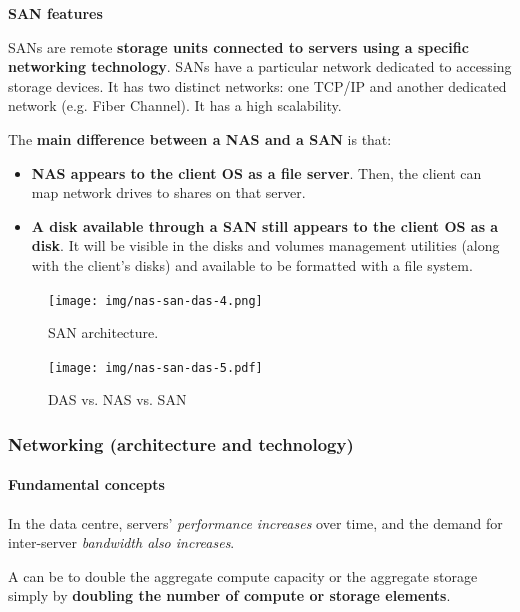 \highspace
\begin{flushleft}
	\textcolor{Red2}{ \textbf{SAN features}}
\end{flushleft}
SANs are remote \textbf{storage units connected to servers using a specific networking technology}. SANs have a particular network dedicated to accessing storage devices. It has two distinct networks: one TCP/IP and another dedicated network (e.g. Fiber Channel). It has a high scalability.

\highspace
The \textbf{main difference between a NAS and a SAN} is that:
\begin{itemize}
	\item \textbf{NAS appears to the client OS as a file server}. Then, the client can map network drives to shares on that server.
	
	\item \textbf{A disk available through a SAN still appears to the client OS as a disk}. It will be visible in the disks and volumes management utilities (along with the client's disks) and available to be formatted with a file system.
\end{itemize}
\begin{figure}[!htp]
	\centering
	\texttt{[image: img/nas-san-das-4.png]}
	\caption{SAN architecture.}
\end{figure}

\begin{figure}[!htp]
	\centering
	\texttt{[image: img/nas-san-das-5.pdf]}
	\caption{DAS vs. NAS vs. SAN}
\end{figure}

\newpage

\subsubsection{Networking (architecture and technology)}\label{subsubsection: Networking (architecture and technology)}

\paragraph{Fundamental concepts}

In the data centre, servers' \emph{performance increases} over time, and the demand for inter-server \emph{bandwidth also increases}.

\highspace
A  can be to double the aggregate compute capacity or the aggregate storage simply by \textbf{doubling the number of compute or storage elements}.

